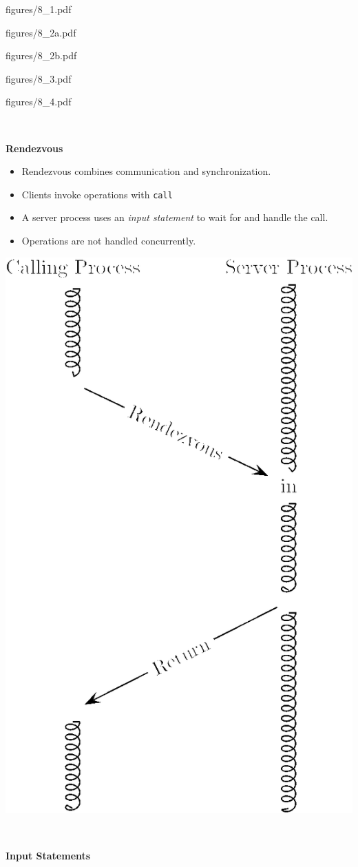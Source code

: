 \documentclass{article}
\newcommand{\myfig}[1]{\newpage\begin{overpic}[scale=1.5]{figures/#1}}
\newcommand{\myfigs}[2]{\newpage\begin{overpic}[scale=#1]{figures/#2}}
\newcommand{\myfigend}{\end{overpic}}
\newcommand{\bi}{\begin{itemize}}
\newcommand{\ii}{\item}
\newcommand{\ei}{\end{itemize}}
\newcommand{\ti}[1]{
\newpage
\mbox{~}

\vspace{1.25in}
\centerline{\bf #1}
}
\begin{document}
\myfigs{1.25}{8_1.pdf}
\myfigend
\myfig{8_2a.pdf}
\myfigend
\myfigs{1.3}{8_2b.pdf}
\myfigend
\myfigs{1.2}{8_3.pdf}
\myfigend
\myfig{8_4.pdf}
\myfigend

\ti{Rendezvous}
\begin{multicols}{2}
\bi
\ii Rendezvous combines communication and synchronization.
\ii Clients invoke operations with {\tt call}
\ii A server process uses an {\em input statement} to wait for and
handle the call. 
\ii Operations are not handled concurrently.
\ei
\vfill
\columnbreak
\hfill
\includegraphics[scale=0.4]{figures/rendezvous.png}
\end{multicols}

\ti{Input Statements}
\end{document}
